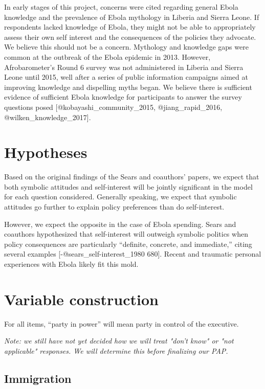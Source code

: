 \documentclass[]{article}
\begin{document}
In early stages of this project, concerns were cited regarding general
Ebola knowledge and the prevalence of Ebola mythology in Liberia and
Sierra Leone. If respondents lacked knowledge of Ebola, they might not
be able to appropriately assess their own self interest and the
consequences of the policies they advocate. We believe this should not
be a concern. Mythology and knowledge gaps were common at the outbreak
of the Ebola epidemic in 2013. However, Afrobarometer's Round 6 survey
was not administered in Liberia and Sierra Leone until 2015, well after
a series of public information campaigns aimed at improving knowledge
and dispelling myths began. We believe there is sufficient evidence of
sufficient Ebola knowledge for participants to answer the survey
questions posed {[}@kobayashi\_community\_2015, @jiang\_rapid\_2016,
@wilken\_knowledge\_2017{]}.

\section{Hypotheses}\label{hypotheses}

Based on the original findings of the Sears and coauthors' papers, we
expect that both symbolic attitudes and self-interest will be jointly
significant in the model for each question considered. Generally
speaking, we expect that symbolic attitudes go further to explain policy
preferences than do self-interest.

However, we expect the opposite in the case of Ebola spending. Sears and
coauthors hypothesized that self-interest will outweigh symbolic
politics when policy consequences are particularly ``definite, concrete,
and immediate,'' citing several examples {[}-@sears\_self-interest\_1980
680{]}. Recent and traumatic personal experiences with Ebola likely fit
this mold.

\section{Variable construction}\label{variable-construction}

For all items, ``party in power'' will mean party in control of the
executive.

\textit{Note: we still have not yet decided how we will treat "don't know" or "not applicable" responses. We will determine this before finalizing our PAP.}

\subsection{Immigration}\label{immigration}
\end{document}
